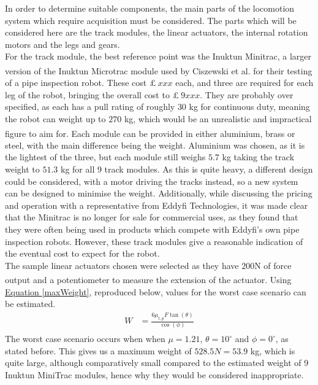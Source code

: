 \documentclass[11pt]{article}		%
\begin{document}
		In order to determine suitable components, the main parts of the locomotion system which require acquisition must be considered.
		The parts which will be considered here are the track modules, the linear actuators, the internal rotation motors and the legs and gears.
		\\
		For the track module, the best reference point was the Inuktun Minitrac, a larger version of the Inuktun Microtrac module used by Ciszewski et al.\textsuperscript{\cite{ciszewski2015design}} for their testing of a pipe inspection robot.
		These cost $£ \ xxx$ each, and three are required for each leg of the robot, bringing the overall cost to $£ \ 9xxx$.
		They are probably over specified, as each has a pull rating of roughly $30$ kg for continuous duty, meaning the robot can weight up to $270$ kg, which would be an unrealistic and impractical figure to aim for\textsuperscript{\cite{inuktunTracks}}.
		Each module can be provided in either aluminium, brass or steel, with the main difference being the weight.
		Aluminium was chosen, as it is the lightest of the three, but each module still weighs $5.7$ kg taking the track weight to $51.3$ kg for all 9 track modules.
		As this is quite heavy, a different design could be considered, with a motor driving the tracks instead, so a new system can be designed to minimise the weight.
		Additionally, while discussing the pricing and operation with a representative from Eddyfi Technologies, it was made clear that the Minitrac is no longer for sale for commercial uses, as they found that they were often being used in products which compete with Eddyfi's own pipe inspection robots.
		However, these track modules give a reasonable indication of the eventual cost to expect for the robot.
		\\
		The sample linear actuators chosen were selected as they have $200$N of force output and a potentiometer to measure the extension of the actuator\textsuperscript{\cite{rsproLinear}}.
		Using \hyperref[maxWeight]{Equation \ref*{maxWeight}}, reproduced below, values for the worst case scenario can be estimated.
		\begin{align*}
			W &= \frac{6 \mu_{t,p} F \tan \left( \theta \right)}{\cos \left( \phi \right)}
		\end{align*}
		The worst case scenario occurs when when $ \mu = 1.21$\textsuperscript{\cite{sato2011development}}, $\theta = 10^\circ$ and $\phi = 0^\circ$, as stated before.
		This gives us a maximum weight of $528.5 N = 53.9$ kg, which is quite large, although comparatively small compared to the estimated weight of 9 Inuktun MiniTrac modules, hence why they would be considered inappropriate.
\end{document}
